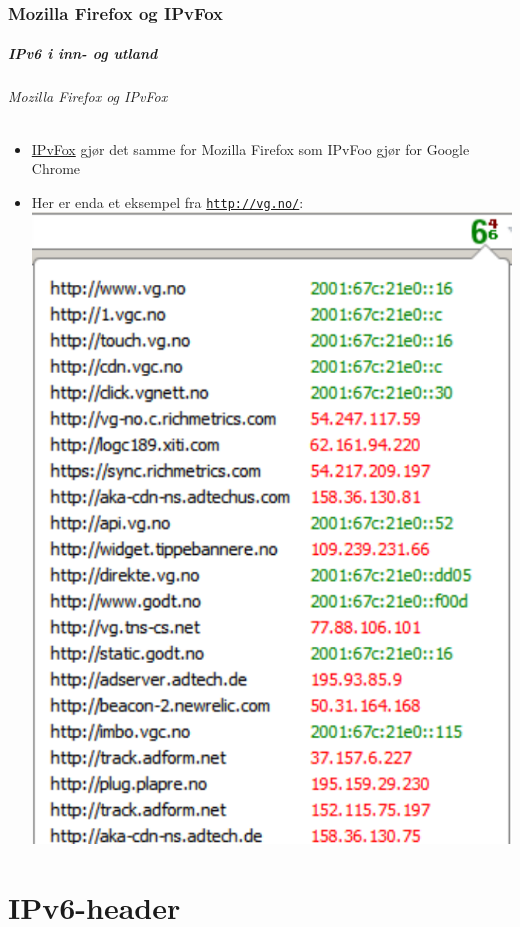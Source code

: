 \section{Mozilla Firefox og IPvFox}
\begin{frame}
  \frametitle{IPv6 i inn- og utland}
  \framesubtitle{Mozilla Firefox og IPvFox}
  \begin{itemize}
  \item
    \href{https://addons.mozilla.org/en-US/firefox/addon/ipvfox/}{IPvFox}
    gjør det samme for Mozilla Firefox som IPvFoo gjør for Google
    Chrome
  \item Her er enda et eksempel fra \texttt{\url{http://vg.no/}}:\\
  \includegraphics[scale=.4]{vg-dot-no-og-IPvFox-i-Mozilla-Firefox-forkortet.pdf}
  \end{itemize}
\end{frame}

\part{IPv6-header}

